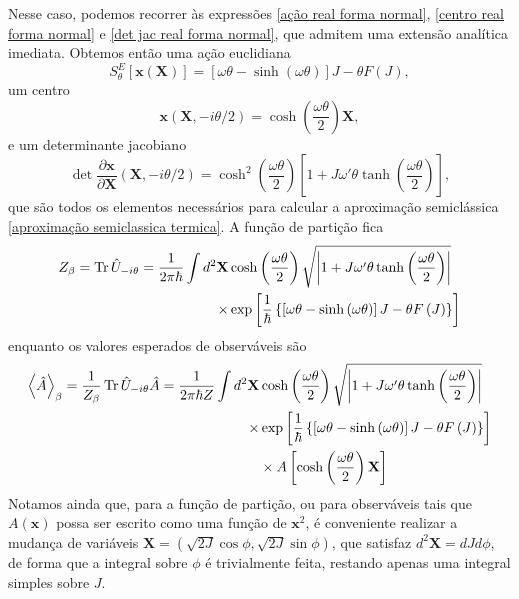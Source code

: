 \documentclass[
	12pt,
	oneside,			%
	a4paper,			%
	english,			%
	brazil				%
	]{abntex2}
\theoremstyle{definition}
\begin{document}
Nesse caso, podemos recorrer às expressões \eqref{ação real forma normal}, \eqref{centro real forma normal} e \eqref{det jac real forma normal}, que admitem uma extensão analítica imediata. Obtemos então uma ação euclidiana
\begin{equation}
\label{ação euclidiana}
    S_\theta^E\left[ \mathbf{x}\left( \mathbf{X}\right) \right] = \left[ \omega \theta - \sinh \left(\omega \theta\right) \right] J - \theta F\left( J \right),
\end{equation}
um centro
\begin{equation}
\label{centro térmico}
    \mathbf{x}\left( \mathbf{X},-i\theta/2 \right) = \cosh \left (\frac{\omega \theta}{2} \right) \mathbf{X},
\end{equation}
e um determinante jacobiano
\begin{equation}
\label{jacobiano tempo imaginário}
    \det \frac{\partial \mathbf{x}}{\partial \mathbf{X}}(\mathbf{X},-i\theta/2) = \cosh^2 \left( \frac{\omega \theta}{2} \right)\left[1 + J \omega'  \theta \tanh \left( \frac{\omega \theta}{2} \right) \right],
\end{equation}
que são todos os elementos necessários para calcular a aproximação semiclássica \eqref{aproximação semiclassica termica}. A função de partição fica
\begin{equation}
    \begin{aligned}
        Z_\beta = \Tr \hat{U}_{-i\theta} = \frac{1}{2\pi \hbar}\int d^2 \mathbf{X}  &\cosh \left( \frac{\omega \theta}{2} \right)\sqrt{\left|1 + J \omega'  \theta \tanh \left( \frac{\omega \theta}{2} \right)\right|}\\  \times &\exp \left[ \frac{1}{\hbar} \left\{ \left[ \omega \theta - \sinh \left(\omega \theta\right) \right] J - \theta F\left( J \right) \right\} \right] 
    \end{aligned}
\end{equation}
enquanto os valores esperados de observáveis são
\begin{equation}
    \begin{aligned}
        \ev{\hat{A}}_\beta = \frac{1}{Z_\beta}\Tr \hat{U}_{-i\theta} \hat{A} = \frac{1}{2\pi \hbar Z}\int d^2 \mathbf{X}  &\cosh \left( \frac{\omega \theta}{2} \right)\sqrt{\left|1 + J \omega'  \theta \tanh \left( \frac{\omega \theta}{2} \right)\right|}\\  \times &\exp \left[ \frac{1}{\hbar} \left\{ \left[ \omega \theta - \sinh \left(\omega \theta\right) \right] J - \theta F\left( J \right) \right\} \right] \\ &\times A \left[ \cosh \left (\frac{\omega \theta}{2} \right) \mathbf{X} \right]
    \end{aligned}
\end{equation}
Notamos ainda que, para a função de partição, ou para observáveis tais que $A(\mathbf{x})$ possa ser escrito como uma função de $\mathbf{x}^2$, é conveniente realizar a mudança de variáveis $\mathbf{X}=\left(\sqrt{2J}\cos \phi,\sqrt{2J}\sin\phi\right)$, que satisfaz $d^2 \mathbf{X} = dJ d\phi$, de forma que a integral sobre $\phi$ é trivialmente feita, restando apenas uma integral simples sobre $J$.
\end{document}
